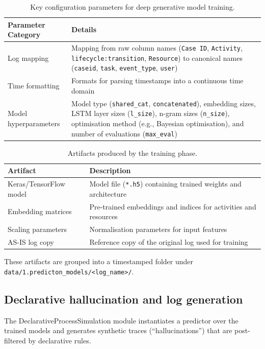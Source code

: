 \documentclass[a4paper,fleqn]{cas-sc}
\begin{document}
\begin{table}[width=.95\linewidth,cols=2,pos=t]
\caption{Key configuration parameters for deep generative model training.}
\label{tbl:training_params}
\begin{tabular*}{\tblwidth}{@{} LL @{}}
\toprule
Parameter Category & Details \\
\midrule
Log mapping & Mapping from raw column names (\texttt{Case ID}, \texttt{Activity}, \texttt{lifecycle:transition}, \texttt{Resource}) to canonical names (\texttt{caseid}, \texttt{task}, \texttt{event\_type}, \texttt{user}) \\
Time formatting & Formats for parsing timestamps into a continuous time domain \\
Model hyperparameters & Model type (\texttt{shared\_cat}, \texttt{concatenated}), embedding sizes, LSTM layer sizes (\texttt{l\_size}), n-gram sizes (\texttt{n\_size}), optimisation method (e.g., Bayesian optimisation), and number of evaluations (\texttt{max\_eval}) \\
\bottomrule
\end{tabular*}
\end{table}

\begin{table}[width=.9\linewidth,cols=2,pos=t]
\caption{Artifacts produced by the training phase.}
\label{tbl:training_outputs}
\begin{tabular*}{\tblwidth}{@{} LL @{}}
\toprule
Artifact & Description \\
\midrule
Keras/TensorFlow model & Model file (\verb|*.h5|) containing trained weights and architecture \\
Embedding matrices & Pre-trained embeddings and indices for activities and resources \\
Scaling parameters & Normalisation parameters for input features \\
AS-IS log copy & Reference copy of the original log used for training \\
\bottomrule
\end{tabular*}
\end{table}

These artifacts are grouped into a timestamped folder under
\verb|data/1.predicton_models/<log_name>/|.

\subsection{Declarative hallucination and log generation}

The DeclarativeProcessSimulation module instantiates a 
predictor over the trained models and generates
synthetic traces (``hallucinations'') that are post-filtered by
declarative rules.
\end{document}
